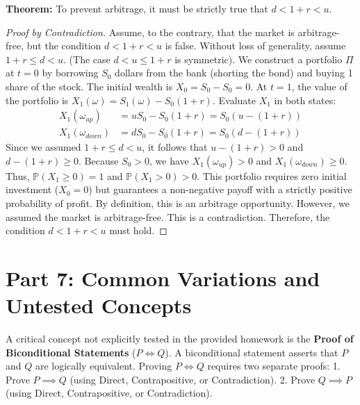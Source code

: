 \documentclass[11pt, a4paper]{article}
\theoremstyle{definition}
\theoremstyle{remark}
\newcommand{\Prob}{\mathbb{P}}
\begin{document}
\textbf{Theorem:} To prevent arbitrage, it must be strictly true that $d < 1+r < u$.

\begin{proof}[Proof by Contradiction]
Assume, to the contrary, that the market is arbitrage-free, but the condition $d < 1+r < u$ is false. 
Without loss of generality, assume $1+r \leq d < u$. (The case $d < u \leq 1+r$ is symmetric).
We construct a portfolio $\Pi$ at $t=0$ by borrowing $S_0$ dollars from the bank (shorting the bond) and buying 1 share of the stock.
The initial wealth is $X_0 = S_0 - S_0 = 0$.
At $t=1$, the value of the portfolio is $X_1(\omega) = S_1(\omega) - S_0(1+r)$.
Evaluate $X_1$ in both states:
\begin{align*}
    X_1(\omega_{up}) &= u S_0 - S_0(1+r) = S_0(u - (1+r)) \\
    X_1(\omega_{down}) &= d S_0 - S_0(1+r) = S_0(d - (1+r))
\end{align*}
Since we assumed $1+r \leq d < u$, it follows that $u - (1+r) > 0$ and $d - (1+r) \geq 0$.
Because $S_0 > 0$, we have $X_1(\omega_{up}) > 0$ and $X_1(\omega_{down}) \geq 0$.
Thus, $\Prob(X_1 \geq 0) = 1$ and $\Prob(X_1 > 0) > 0$.
This portfolio requires zero initial investment ($X_0 = 0$) but guarantees a non-negative payoff with a strictly positive probability of profit. By definition, this is an arbitrage opportunity.
However, we assumed the market is arbitrage-free. This is a contradiction. 
Therefore, the condition $d < 1+r < u$ must hold.
\end{proof}

\section{Part 7: Common Variations and Untested Concepts}

A critical concept not explicitly tested in the provided homework is the \textbf{Proof of Biconditional Statements} ($P \iff Q$). A biconditional statement asserts that $P$ and $Q$ are logically equivalent. Proving $P \iff Q$ requires two separate proofs:
1. Prove $P \implies Q$ (using Direct, Contrapositive, or Contradiction).
2. Prove $Q \implies P$ (using Direct, Contrapositive, or Contradiction).
\end{document}
